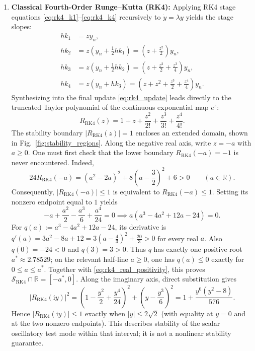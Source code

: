 \begin{enumerate}
    \item \textbf{Classical Fourth-Order Runge--Kutta (RK4):} Applying RK4 stage equations \eqref{eq:rk4_k1}--\eqref{eq:rk4_k4} recursively to $\dot{y} = \lambda y$ yields the stage slopes:
    \begin{align}
    h k_1 &= z y_n, \label{eq:rk4_stg1} \\
    h k_2 &= z \left( y_n + \frac{1}{2} h k_1 \right) = \left( z + \frac{z^2}{2} \right) y_n, \label{eq:rk4_stg2} \\
    h k_3 &= z \left( y_n + \frac{1}{2} h k_2 \right) = \left( z + \frac{z^2}{2} + \frac{z^3}{4} \right) y_n, \label{eq:rk4_stg3} \\
    h k_4 &= z \left( y_n + h k_3 \right) = \left( z + z^2 + \frac{z^3}{2} + \frac{z^4}{4} \right) y_n. \label{eq:rk4_stg4}
    \end{align}
    Synthesizing into the final update \eqref{eq:rk4_update} leads directly to the truncated Taylor polynomial of the continuous exponential map $e^z$:
    \begin{equation}
    \label{eq:R_RK4}
    R_{\mathrm{RK4}}(z) = 1 + z + \frac{z^2}{2!} + \frac{z^3}{3!} + \frac{z^4}{4!}.
    \end{equation}
    The stability boundary $|R_{\mathrm{RK4}}(z)| = 1$ encloses an extended domain, shown in Fig.~\ref{fig:stability_regions}. Along the negative real axis, write $z=-a$ with $a\geq0$. One must first check that the lower boundary $R_{\mathrm{RK4}}(-a)=-1$ is never encountered. Indeed,
    \begin{equation}
    \label{eq:rk4_real_positivity}
    24R_{\mathrm{RK4}}(-a)
    =(a^2-2a)^2+8\left(a-\frac32\right)^2+6>0
    \qquad(a\in\mathbb R).
    \end{equation}
    Consequently, $|R_{\mathrm{RK4}}(-a)|\leq1$ is equivalent to $R_{\mathrm{RK4}}(-a)\leq1$. Setting its nonzero endpoint equal to $1$ yields
    \begin{equation}
    \label{eq:rk4_real_root}
    -a + \frac{a^2}{2} - \frac{a^3}{6} + \frac{a^4}{24} = 0 \implies a\left(a^3 - 4a^2 + 12a - 24\right) = 0.
    \end{equation}
    For $q(a):=a^3-4a^2+12a-24$, its derivative is $q'(a)=3a^2-8a+12=3(a-\tfrac43)^2+\tfrac{20}{3}>0$ for every real $a$. Also $q(0)=-24<0$ and $q(3)=3>0$. Thus $q$ has exactly one positive root $a^*\approx2.78529$; on the relevant half-line $a\geq0$, one has $q(a)\leq0$ exactly for $0\leq a\leq a^*$. Together with \eqref{eq:rk4_real_positivity}, this proves $\mathcal S_{\mathrm{RK4}}\cap\mathbb R=[-a^*,0]$. Along the imaginary axis, direct substitution gives
    \begin{equation}
    \label{eq:rk4_imaginary_axis_modulus}
    |R_{\mathrm{RK4}}(\mathrm i y)|^2
    =\left(1-\frac{y^2}{2}+\frac{y^4}{24}\right)^2
     +\left(y-\frac{y^3}{6}\right)^2
    =1+\frac{y^6(y^2-8)}{576}.
    \end{equation}
    Hence $|R_{\mathrm{RK4}}(\mathrm i y)|\leq1$ exactly when $|y|\leq2\sqrt2$ (with equality at $y=0$ and at the two nonzero endpoints). This describes stability of the scalar oscillatory test mode within that interval; it is not a nonlinear stability guarantee.


\end{enumerate}
